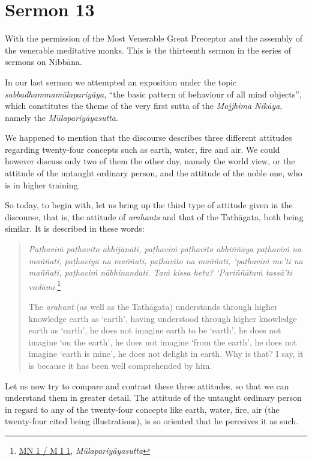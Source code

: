 \chapter{Sermon 13}

\NibbanaOpeningQuote

With the permission of the Most Venerable Great Preceptor and the assembly of the venerable meditative monks. This is the thirteenth sermon in the series of sermons on Nibbāna.

In our last sermon we attempted an exposition under the topic \emph{sabbadhammamūlapariyāya}, ``the basic pattern of behaviour of all mind objects'', which constitutes the theme of the very first sutta of the \emph{Majjhima Nikāya}, namely the \emph{Mūlapariyāyasutta}.

We happened to mention that the discourse describes three different attitudes regarding twenty-four concepts such as earth, water, fire and air. We could however discuss only two of them the other day, namely the world view, or the attitude of the untaught ordinary person, and the attitude of the noble one, who is in higher training.

So today, to begin with, let us bring up the third type of attitude given in the discourse, that is, the attitude of \emph{arahants} and that of the Tathāgata, both being similar. It is described in these words:

\begin{quote}
\emph{Paṭhaviṁ paṭhavito abhijānāti, paṭhaviṁ paṭhavito abhiññāya paṭhaviṁ na maññati, paṭhaviyā na maññati, paṭhavito na maññati, `paṭhaviṁ me'ti na maññati, paṭhaviṁ nābhinandati. Taṁ kissa hetu? `Pariññātaṁ tassā'ti vadāmi}.\footnote{\href{https://suttacentral.net/mn1/pli/ms}{MN 1 / M I 1}, \emph{Mūlapariyāyasutta}}

The \emph{arahant} (as well as the Tathāgata) understands through higher knowledge earth as `earth', having understood through higher knowledge earth as `earth', he does not imagine earth to be `earth', he does not imagine `on the earth', he does not imagine `from the earth', he does not imagine `earth is mine', he does not delight in earth. Why is that? I say, it is because it has been well comprehended by him.
\end{quote}

Let us now try to compare and contrast these three attitudes, so that we can understand them in greater detail. The attitude of the untaught ordinary person in regard to any of the twenty-four concepts like earth, water, fire, air (the twenty-four cited being illustrations), is so oriented that he perceives it as such.

